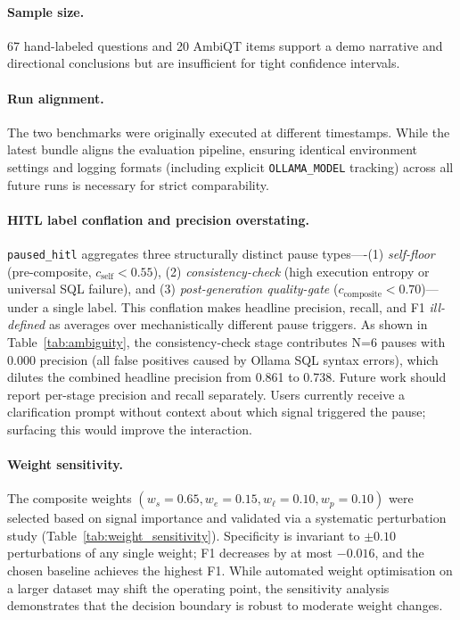 \documentclass{article}
\begin{document}
\paragraph{Sample size.}
67 hand-labeled questions and 20 AmbiQT items support a demo narrative and
directional conclusions but are insufficient for tight confidence intervals.

\paragraph{Run alignment.}
The two benchmarks were originally executed at different timestamps. While the
latest bundle aligns the evaluation pipeline, ensuring identical environment
settings and logging formats (including explicit \texttt{OLLAMA\_MODEL}
tracking) across all future runs is necessary for strict comparability.

\paragraph{HITL label conflation and precision overstating.}
\texttt{paused\_hitl} aggregates three structurally distinct pause types----(1)
\emph{self-floor} (pre-composite, $c_{\text{self}} < 0.55$),
(2) \emph{consistency-check} (high execution entropy or universal SQL failure), and
(3) \emph{post-generation quality-gate} ($c_{\text{composite}} < 0.70$)---under a
single label. This conflation makes headline precision, recall, and F1 \emph{ill-defined}
as averages over mechanistically different pause triggers.
As shown in Table~\ref{tab:ambiguity}, the consistency-check stage contributes
N=6 pauses with 0.000 precision (all false positives caused by Ollama SQL syntax
errors), which dilutes the combined headline precision from 0.861 to 0.738.
Future work should report per-stage precision and recall separately.
Users currently receive a clarification prompt without context about which signal
triggered the pause; surfacing this would improve the interaction.

\paragraph{Weight sensitivity.}
The composite weights $(w_s{=}0.65, w_e{=}0.15, w_\ell{=}0.10, w_p{=}0.10)$ were selected
based on signal importance and validated via a systematic perturbation study (Table~\ref{tab:weight_sensitivity}).
Specificity is invariant to $\pm 0.10$ perturbations of any single weight;
F1 decreases by at most $-0.016$, and the chosen baseline achieves the
highest F1. While automated weight optimisation on a larger dataset
may shift the operating point, the sensitivity analysis demonstrates
that the decision boundary is robust to moderate weight changes.
\end{document}
